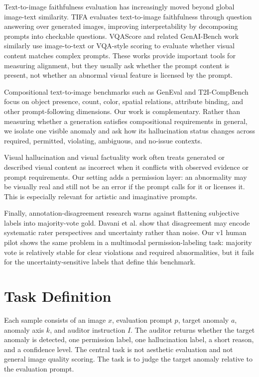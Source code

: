 \documentclass[11pt]{article}
\begin{document}
Text-to-image faithfulness evaluation has increasingly moved beyond global image-text similarity. TIFA evaluates text-to-image faithfulness through question answering over generated images, improving interpretability by decomposing prompts into checkable questions. VQAScore and related GenAI-Bench work similarly use image-to-text or VQA-style scoring to evaluate whether visual content matches complex prompts. These works provide important tools for measuring alignment, but they usually ask whether the prompt content is present, not whether an abnormal visual feature is licensed by the prompt.

Compositional text-to-image benchmarks such as GenEval and T2I-CompBench focus on object presence, count, color, spatial relations, attribute binding, and other prompt-following dimensions. Our work is complementary. Rather than measuring whether a generation satisfies compositional requirements in general, we isolate one visible anomaly and ask how its hallucination status changes across required, permitted, violating, ambiguous, and no-issue contexts.

Visual hallucination and visual factuality work often treats generated or described visual content as incorrect when it conflicts with observed evidence or prompt requirements. Our setting adds a permission layer: an abnormality may be visually real and still not be an error if the prompt calls for it or licenses it. This is especially relevant for artistic and imaginative prompts.

Finally, annotation-disagreement research warns against flattening subjective labels into majority-vote gold. Davani et al. show that disagreement may encode systematic rater perspectives and uncertainty rather than noise. Our v1 human pilot shows the same problem in a multimodal permission-labeling task: majority vote is relatively stable for clear violations and required abnormalities, but it fails for the uncertainty-sensitive labels that define this benchmark.

\section{Task Definition}

Each sample consists of an image $x$, evaluation prompt $p$, target anomaly $a$, anomaly axis $k$, and auditor instruction $I$. The auditor returns whether the target anomaly is detected, one permission label, one hallucination label, a short reason, and a confidence level. The central task is not aesthetic evaluation and not general image quality scoring. The task is to judge the target anomaly relative to the evaluation prompt.
\end{document}
